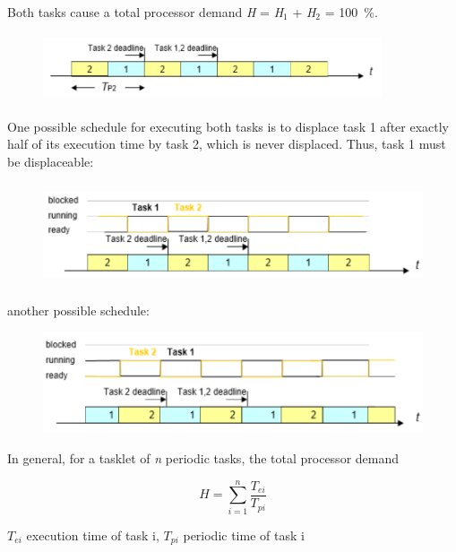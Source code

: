 Both tasks cause a total processor demand \textit{H} = \textit{H}${}_{1}$ + \textit{H}${}_{2}$ = 100~\%.

	\begin{figure}[h]
    \centering
    \includegraphics[width=10cm, height=2cm]{Images/image85.png}
    \label{fig:Fig }
    \end{figure} 
\newpage
One possible schedule for executing both tasks is to displace task 1 after exactly half of its execution time by task 2, which is never displaced. Thus, task 1 must be displaceable:

	\begin{figure}[h]
    \centering
    \includegraphics[width=12cm, height=3cm]{Images/image86.png}
    \label{fig:Fig }
    \end{figure} 

another possible schedule:

	\begin{figure}[h]
    \centering
    \includegraphics[width=12cm, height=3cm]{Images/image87.png}
    \label{fig:Fig }
    \end{figure}

In general, for a tasklet of \textit{n} periodic tasks, the total processor demand

\begin{equation}
	H=\sum _{i=1}^{n}\frac{T_{ei} }{T_{pi}}
\label{EQ 3}
\end{equation}

$T_{ei}$ execution time of task i, $T_{pi}$ periodic time of task i

\newpage

